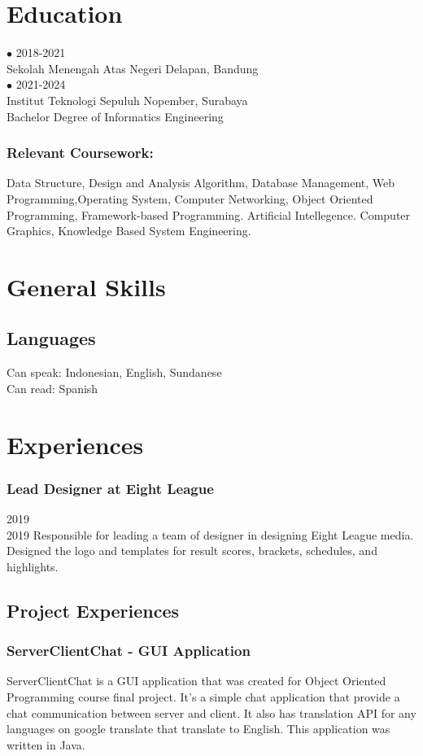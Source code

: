 \documentclass{article}
\begin{document}
\section{Education}
{\Large $ \bullet $ 2018-2021} \\
{Sekolah Menengah Atas Negeri Delapan, Bandung}
\\[2em]
{\Large $ \bullet $ 2021-2024} \\
{Institut Teknologi Sepuluh Nopember, Surabaya}
\\
{Bachelor Degree of Informatics Engineering}
\subsubsection{Relevant Coursework:}
Data Structure, Design and Analysis Algorithm, Database Management, Web Programming,Operating System, Computer Networking, Object Oriented Programming, Framework-based Programming. Artificial Intellegence. Computer Graphics, Knowledge Based System Engineering.

\section{General Skills}

\subsection{Languages}
Can speak: Indonesian, English, Sundanese \\
Can read: Spanish 

\section{Experiences}
\subsubsection{Lead Designer at Eight League}
{\large 2019} \\
{\large 2019}
Responsible for leading a team of designer in designing Eight League media. Designed the logo and templates for result scores, brackets, schedules, and highlights. 

\subsection{Project Experiences}
\subsubsection{ServerClientChat - GUI Application}
ServerClientChat is a GUI application that was created for Object Oriented Programming course final project. It's a simple chat application 
that provide a chat communication between server and client. It also has translation API for any languages on google translate that translate to English. This application was written in Java.
\end{document}

